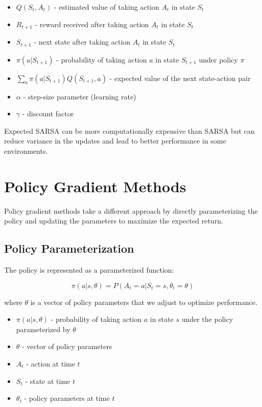 \documentclass[11pt,a4paper]{article}
\begin{document}
\begin{tcolorbox}[title=Notation Overview]
\begin{itemize}
    \item $Q(S_t, A_t)$ - estimated value of taking action $A_t$ in state $S_t$
    \item $R_{t+1}$ - reward received after taking action $A_t$ in state $S_t$
    \item $S_{t+1}$ - next state after taking action $A_t$ in state $S_t$
    \item $\pi(a|S_{t+1})$ - probability of taking action $a$ in state $S_{t+1}$ under policy $\pi$
    \item $\sum_a \pi(a|S_{t+1})Q(S_{t+1}, a)$ - expected value of the next state-action pair
    \item $\alpha$ - step-size parameter (learning rate)
    \item $\gamma$ - discount factor
\end{itemize}
\end{tcolorbox}

Expected SARSA can be more computationally expensive than SARSA but can reduce variance in the updates and lead to better performance in some environments.

\section{Policy Gradient Methods}

Policy gradient methods take a different approach by directly parameterizing the policy and updating the parameters to maximize the expected return.

\subsection{Policy Parameterization}

The policy is represented as a parameterized function:

\begin{equation}
\pi(a|s, \theta) = P(A_t = a | S_t = s, \theta_t = \theta)
\end{equation}

where $\theta$ is a vector of policy parameters that we adjust to optimize performance.

\begin{tcolorbox}[title=Notation Overview]
\begin{itemize}
    \item $\pi(a|s, \theta)$ - probability of taking action $a$ in state $s$ under the policy parameterized by $\theta$
    \item $\theta$ - vector of policy parameters
    \item $A_t$ - action at time $t$
    \item $S_t$ - state at time $t$
    \item $\theta_t$ - policy parameters at time $t$
\end{itemize}
\end{tcolorbox}
\end{document}
